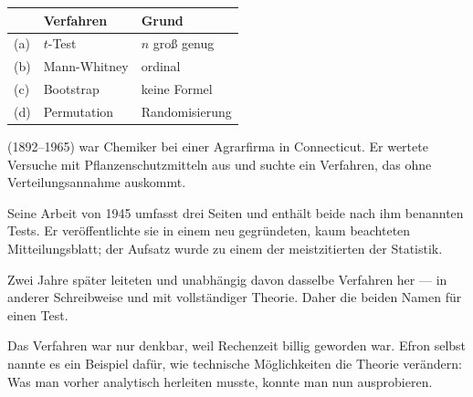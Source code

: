 \begin{aufgabe}
\begin{center}
\renewcommand{\arraystretch}{1.45}
\begin{tabular}{@{}P{1.0cm}P{3.0cm}P{4.0cm}@{}}
\toprule
& \textbf{Verfahren} & \textbf{Grund}\\
\midrule
(a) & $t$-Test & $n$ groß genug\\
(b) & Mann-Whitney & ordinal\\
(c) & Bootstrap & keine Formel\\
(d) & Permutation & Randomisierung\\
\bottomrule
\end{tabular}
\end{center}
\end{aufgabe}

\begin{geschichte}
 (1892--1965) war Chemiker bei einer Agrarfirma in Connecticut. Er wertete Versuche mit Pflanzenschutzmitteln aus und suchte ein Verfahren, das ohne Verteilungsannahme auskommt.

Seine Arbeit von 1945 umfasst drei Seiten und enthält beide nach ihm benannten Tests. Er veröffentlichte sie in einem neu gegründeten, kaum beachteten Mitteilungsblatt; der Aufsatz wurde zu einem der meistzitierten der Statistik.

Zwei Jahre später leiteten  und  unabhängig davon dasselbe Verfahren her --- in anderer Schreibweise und mit vollständiger Theorie. Daher die beiden Namen für einen Test.

\begin{center}
\begin{minipage}{0.9\textwidth}
\end{minipage}
\end{center}

Das Verfahren war nur denkbar, weil Rechenzeit billig geworden war. Efron selbst nannte es ein Beispiel dafür, wie technische Möglichkeiten die Theorie verändern: Was man vorher analytisch herleiten musste, konnte man nun ausprobieren.
\end{geschichte}

